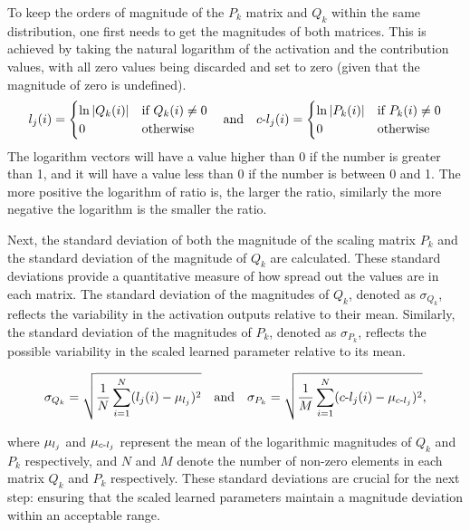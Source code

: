 To keep the orders of magnitude of the \(P_{k}\) matrix and $Q_{k}$ within the same distribution, one first needs to get the magnitudes of both matrices. This is achieved by taking the natural logarithm of the activation and the contribution values, with all zero values being discarded and set to zero (given that the magnitude of zero is undefined). 
\begin{equation}
\label{eq:log}
    l_{j} (i) = \begin{cases}
    \ln |Q_k(i)| & \mbox{if $Q_k(i)\not=0$}\\
    0 & \mbox{otherwise}
    \end{cases}
    \quad\mbox{and}\quad 
    \text{$c$-}l_{j}(i) =  \begin{cases}
    \ln |P_k(i)| & \mbox{if $P_k(i)\not=0$}\\
    0 & \mbox{otherwise}
    \end{cases} 
\end{equation}
\newline
The logarithm vectors will have a value higher than 0 if the number is greater than 1, and it will have a value less than 0 if the number is between 0 and 1. The more positive the logarithm of ratio is, the larger the ratio, similarly the more negative the logarithm is the smaller the ratio.

Next, the standard deviation of both the magnitude of the scaling matrix \(P_{k}\) and the standard deviation of the magnitude of \(Q_{k}\) are calculated. These standard deviations provide a quantitative measure of how spread out the values are in each matrix. The standard deviation of the magnitudes of \(Q_{k}\), denoted as \(\sigma_{Q_k}\), reflects the variability in the activation outputs relative to their mean. Similarly, the standard deviation of the magnitudes of \(P_{k}\), denoted as \(\sigma_{P_k}\), reflects the possible variability in the scaled learned parameter relative to its mean.

\begin{equation}
\sigma_{Q_k} = \sqrt{\frac{1}{N} \sum_{i=1}^{N} (l_{j}(i) - \mu_{l_{j}})^2}
\quad \text{and} \quad
\sigma_{P_k} = \sqrt{\frac{1}{M} \sum_{i=1}^{N} (\text{$c$-}l_{j}(i) - \mu_{\text{$c$-}l_{j}})^2},
\end{equation}

where \(\mu_{l_{j}}\) and \(\mu_{\text{$c$-}l_{j}}\) represent the mean of the logarithmic magnitudes of \(Q_{k}\) and \(P_{k}\) respectively, and \(N\) and \(M\) denote the number of non-zero elements in each matrix $Q_k$ and $P_k$ respectively. These standard deviations are crucial for the next step: ensuring that the scaled learned parameters maintain a magnitude deviation within an acceptable range.

